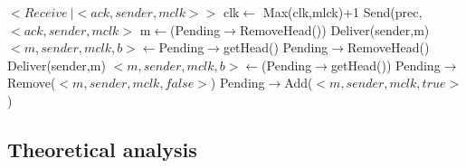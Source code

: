 \documentclass[a4paper]{article}
\begin{document}
\begin{algorithm}[H]
    \centering
    \begin{algorithmic}[5]

        \Event $<Receive\  | <ack,sender, mclk>>$
        \State clk$\gets$ Max(clk,mlck)+1
        \State Send(prec,$<ack,sender,mclk>$
        \EndIf
        \State m$\gets$(Pending$\rightarrow$RemoveHead())
        \State Deliver(sender,m)
        \State $<m,sender,mclk,b>\gets$Pending$\rightarrow$getHead()
        \State Pending$\rightarrow$RemoveHead()
        \State Deliver(sender,m)
        \State $<m,sender,mclk,b>\gets$(Pending$\rightarrow$getHead())
        \EndWhile
        \Else
        \State Pending$\rightarrow$Remove($<m,sender,mclk,false>$)
        \State Pending$\rightarrow$Add($<m,sender,mclk,true>$)
        \EndIf
        \EndEvent
    \end{algorithmic}
\end{algorithm}


\subsection{Theoretical analysis}
\end{document}
